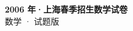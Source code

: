 \documentclass[zihao=-4, a4paper]{ctexart}
\begin{document}
\begin{center}
  {\Large\bfseries 2006 年·上海春季招生数学试卷}\\[4pt]
  {\large 数学 · 试题版}
\end{center}
\medskip
{}

\end{document}
